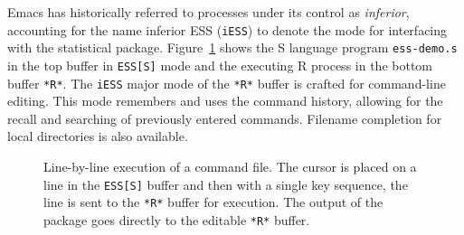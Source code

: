 \documentclass{article}
\newcommand{\stexttt}[1]{{\small\texttt{#1}}}
\begin{document}
Emacs has historically referred to processes under its control as
\textit{inferior}, accounting for the name inferior ESS
(\stexttt{iESS}) to denote the mode for interfacing with the
statistical package.  Figure~\ref{f.ess-demo} shows the S language
program \stexttt{ess-demo.s} in the top buffer in \stexttt{ESS[S]}
mode and the executing R process in the bottom buffer \stexttt{*R*}.
The \stexttt{iESS} major mode of the \stexttt{*R*} buffer is crafted
for command-line editing.  This mode remembers and uses the command
history, allowing for the recall and searching of previously entered
commands.  Filename completion for local directories is also
available.


\begin{figure}[tb]
  \caption{Line-by-line execution of a command file. The cursor is
    placed on a line in the \stexttt{ESS[S]} buffer and then with a
    single key sequence, the line is sent to the \stexttt{*R*} buffer
    for execution.  The output of the package goes directly to the
    editable \stexttt{*R*} buffer.}
  \label{f.ess-demo}
\end{figure}
\end{document}
